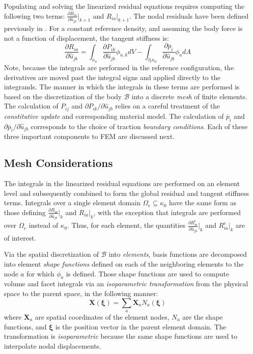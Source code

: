 Populating and solving the linearized residual equations requires computing the following two terms: $\frac{\partial R_{ia}}{\partial \hat{u}_{jb}} \big|_{k+1}$ and $R_{ia}\big|_{k+1}$. The nodal residuals have been defined previously in . For a constant reference density, and assuming the body force is not a function of displacement, the tangent stiffness is:
\begin{equation}
\frac{\partial R_{ia}}{\partial \hat{u}_{jb}} = \int_{\kappa_0}\frac{\partial P_{ik}}{\partial \hat{u}_{jb}}\phi_{a,k}dV - \int_{\partial_t\kappa_0}\frac{\partial \overline{p}_i}{\partial \hat{u}_{jb}}\phi_adA
\end{equation}
Note, because the integrals are performed in the reference configuration, the derivatives are moved past the integral signs and applied directly to the integrands. The manner in which the integrals in these terms are performed is based on the discretization of the body $\mathcal{B}$ into a discrete \textit{mesh} of finite elements. The calculation of $P_{ij}$ and $\partial{P}_{ik}/\partial{\hat{u}_{jb}}$ relies on a careful treatment of the \textit{constitutive update} and corresponding material model. The calculation of $\overline{p}_i$ and $\partial{\overline{p}_i}/\partial{\hat{u}_{jb}}$ corresponds to the choice of traction \textit{boundary conditions}. Each of these three important components to FEM are discussed next.

\subsection{Mesh Considerations}

The integrals in the linearized residual equations are performed on an element level and subsequently combined to form the global residual and tangent stiffness terms. Integrals over a single element domain $\Omega_e \subseteq \kappa_0$ have the same form as those defining $\frac{\partial R_{ia}}{\partial \hat{u}_{jb}} \big|_k$ and $R_{ia}\big|_k$, with the exception that integrals are performed over $\Omega_e$ instead of $\kappa_0$. Thus, for each element, the quantities $\frac{\partial R^e_{ia}}{\partial \hat{u}_{jb}} \big|_k$ and $R^e_{ia}\big|_k$ are of interest.

Via the spatial discretization of $\mathcal{B}$ into \textit{elements}, basis functions are decomposed into element \textit{shape functions} defined on each of the neighboring elements to the node $a$ for which $\phi_a$ is defined. Those shape functions are used to compute volume and facet integrals via an \textit{isoparametric transformation} from the physical space to the parent space, in the following manner:
\begin{equation}
\bm{X}(\bm{\xi}) = \sum\limits_{a}\bm{X}_a{N}_a(\bm{\xi})
\end{equation}
where $\bm{X}_a$ are spatial coordinates of the element nodes, $N_a$ are the shape functions, and $\bm{\xi}$ is the position vector in the parent element domain. The transformation is \textit{isoparametric} because the same shape functions are used to interpolate nodal displacements.

